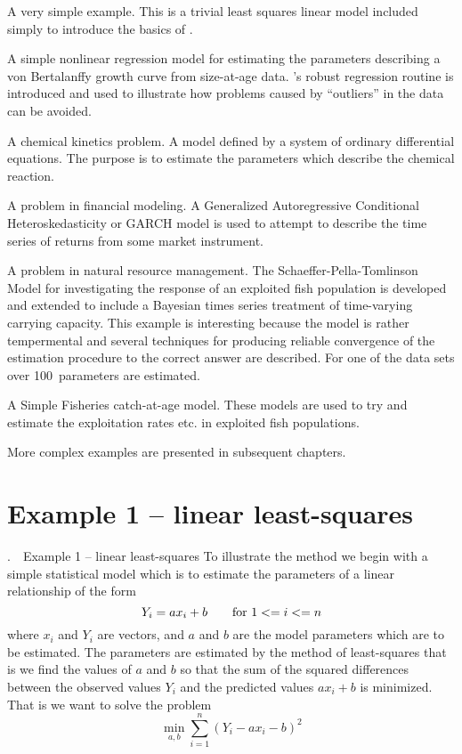 \documentclass[12pt]{book}
\makeatletter
\def\mysection#1{\section{#1}{\bigbf \medbreak\noindent\number\c@chapter.\number\c@section\ \ #1\medbreak}}
\makeatother
\begin{document}

A very simple example. This is a trivial least squares
linear model included simply to introduce the basics of 
\ADM.

A simple nonlinear regression model for estimating the parameters
describing a von Bertalanffy growth curve from size-at-age data.
\ADM's robust regression routine is introduced and used to illustrate
how problems caused by ``outliers'' in the data can be avoided. 

A chemical kinetics problem.  A model defined by a
system of ordinary differential equations. The purpose is to
estimate the parameters which describe the chemical reaction.  

A problem in financial modeling. A Generalized Autoregressive 
Conditional \hbox{Heteroskedasticity} or GARCH model  is used
to attempt to describe  the time series of returns from some
market instrument.

A problem in natural resource management. The 
Schaeffer-Pella-Tomlinson Model
for investigating the response of an exploited fish population
is developed and extended to include
a Bayesian times series treatment of time-varying carrying 
capacity.  This example is interesting because the model
is rather tempermental and several techniques for
producing reliable convergence of the estimation procedure to
the correct answer are described. For one of the data sets over 
100~parameters are estimated.  

A Simple Fisheries catch-at-age model. These models
are used to try and estimate the exploitation rates etc. in
exploited fish populations. 

More complex examples are presented in subsequent chapters. 
\par

\mysection{Example 1 -- linear least-squares}
To illustrate the method we begin with a simple statistical
model which is to estimate the parameters of
a linear relationship of the form 
$$Y_{i} =ax_i+b\qquad \hbox{\rm for}\ 1<=i<=n$$
where $x_i$ and $Y_i$ are vectors, and $a$ and $b$ are the model parameters
which are to be estimated. The parameters are estimated by the method
of least-squares that is we find the values of $a$ and $b$ so that
the sum of the squared differences between the observed values
$Y_i$ and the predicted values $ax_i+b$ is minimized. That is
we want to solve the problem
$$\min_{a,b}\sum_{i=1}^n(Y_i-ax_i-b)^2$$   
\end{document}
